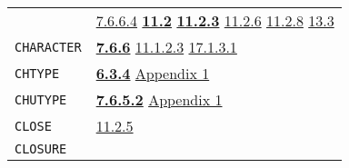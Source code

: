 \documentclass[a4paper,]{article}
\begin{document}
\begin{longtable}[]{@{}ll@{}}
\begin{minipage}[t]{0.24\columnwidth}
\end{minipage} & \begin{minipage}[t]{0.70\columnwidth}\raggedright\strut
\href{07-structured-objects.md\#7664-unparse-1}{7.6.6.4} \textbf{\href{11-input-output.md\#112-channel-the-type}{11.2}}
\textbf{\href{11-input-output.md\#1123-channel-the-subr}{11.2.3}} \href{11-input-output.md\#1126-chanlist}{11.2.6}
\href{11-input-output.md\#1128-contents-of-channels}{11.2.8}
\href{13-association-properties.md\#133-examples-of-association}{13.3}\strut
\end{minipage}\tabularnewline
\begin{minipage}[t]{0.24\columnwidth}\raggedright\strut
\texttt{CHARACTER}\strut
\end{minipage} & \begin{minipage}[t]{0.70\columnwidth}\raggedright\strut
\textbf{\href{07-structured-objects.md\#766-string-the-primtype-and-character-1}{7.6.6}}
\href{11-input-output.md\#11123-princ}{11.1.2.3} \href{17-macro-operations.md\#17131-read-finally}{17.1.3.1}\strut
\end{minipage}\tabularnewline
\begin{minipage}[t]{0.24\columnwidth}\raggedright\strut
\texttt{CHTYPE}\strut
\end{minipage} & \begin{minipage}[t]{0.70\columnwidth}\raggedright\strut
\textbf{\href{06-data-types.md\#634-chtype-1}{6.3.4}} \href{appendix-1-a-look-inside.md\#appendix-1-a-look-inside}{Appendix
1}\strut
\end{minipage}\tabularnewline
\begin{minipage}[t]{0.24\columnwidth}\raggedright\strut
\texttt{CHUTYPE}\strut
\end{minipage} & \begin{minipage}[t]{0.70\columnwidth}\raggedright\strut
\textbf{\href{07-structured-objects.md\#7652-chutype-1}{7.6.5.2}}
\href{appendix-1-a-look-inside.md\#basic-data-structures}{Appendix 1}\strut
\end{minipage}\tabularnewline
\begin{minipage}[t]{0.24\columnwidth}\raggedright\strut
\texttt{CLOSE}\strut
\end{minipage} & \begin{minipage}[t]{0.70\columnwidth}\raggedright\strut
\href{11-input-output.md\#1125-close}{11.2.5}\strut
\end{minipage}\tabularnewline
\begin{minipage}[t]{0.24\columnwidth}\raggedright\strut
\texttt{CLOSURE}\strut

\end{minipage}
\end{longtable}
\end{document}

